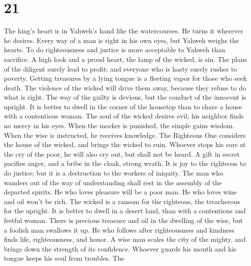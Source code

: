 \hypertarget{section-20}{%
\section{21}\label{section-20}}

 The king's heart is in Yahweh's hand like the
watercourses. He turns it wherever he desires.  Every way
of a man is right in his own eyes, but Yahweh weighs the hearts.
 To do righteousness and justice is more acceptable to
Yahweh than sacrifice.  A high look and a proud heart, the
lamp of the wicked, is sin.  The plans of the diligent
surely lead to profit; and everyone who is hasty surely rushes to
poverty.  Getting treasures by a lying tongue is a
fleeting vapor for those who seek death.  The violence of
the wicked will drive them away, because they refuse to do what is
right.  The way of the guilty is devious, but the conduct
of the innocent is upright.  It is better to dwell in the
corner of the housetop than to share a house with a contentious woman.
 The soul of the wicked desires evil; his neighbor finds
no mercy in his eyes.  When the mocker is punished, the
simple gains wisdom. When the wise is instructed, he receives knowledge.
 The Righteous One considers the house of the wicked, and
brings the wicked to ruin.  Whoever stops his ears at the
cry of the poor, he will also cry out, but shall not be heard.
 A gift in secret pacifies anger, and a bribe in the
cloak, strong wrath.  It is joy to the righteous to do
justice; but it is a destruction to the workers of iniquity.
 The man who wanders out of the way of understanding
shall rest in the assembly of the departed spirits.  He
who loves pleasure will be a poor man. He who loves wine and oil won't
be rich.  The wicked is a ransom for the righteous, the
treacherous for the upright.  It is better to dwell in a
desert land, than with a contentious and fretful woman. 
There is precious treasure and oil in the dwelling of the wise, but a
foolish man swallows it up.  He who follows after
righteousness and kindness finds life, righteousness, and honor.
 A wise man scales the city of the mighty, and brings
down the strength of its confidence.  Whoever guards his
mouth and his tongue keeps his soul from troubles.  The
